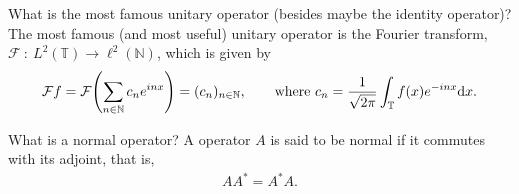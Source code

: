 \documentclass[avery5388,grid,frame]{flashcards}
\newcommand{\f}[3]{#1\ :\ #2 \rightarrow #3}
\def\torus{\mathbb{T}}
\begin{document}
\begin{flashcard}
    {What is the most famous unitary operator (besides maybe the identity operator)?}
    The most famous (and most useful) unitary operator is the Fourier transform, $\f{\mathcal{F}}{L^2(\torus)}{\ell^2(\mathbb{N})}$, which is given by
    \begin{align*}
        \mathcal{F}f = \mathcal{F}\qty(\sum_{n\in\mathbb{N}}c_n e^{inx}) = (c_n)_{n\in\mathbb{N}}, \qquad \text{where } c_n = \frac{1}{\sqrt{2\pi}}\int_\torus f(x) e^{-inx}\dd x.
    \end{align*}
\end{flashcard}

\begin{flashcard}
    {What is a normal operator?}
    A operator $A$ is said to be normal if it commutes with its adjoint, that is,
    \begin{align*}
        AA^* = A^*A.
    \end{align*}
\end{flashcard}
\end{document}
